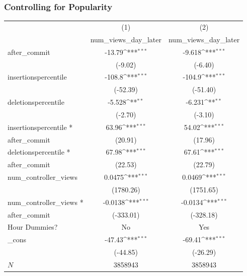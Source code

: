 \documentclass[xcolor=pdftex,dvipsnames,table]{beamer}
\begin{document}
\frame
{
    \frametitle{Controlling for Popularity}
    \begin{table}[h!]
        \centering
        \tiny
    {
        \def\sym#1{\ifmmode^{#1}\else\(^{#1}\)\fi}
        \begin{tabular}{l*{2}{c}}
        \hline\hline
            &\multicolumn{1}{c}{(1)}&\multicolumn{1}{c}{(2)}\\
            &\multicolumn{1}{c}{num\_views\_day\_later}&\multicolumn{1}{c}{num\_views\_day\_later}\\
            \hline
            after\_commit&      -13.79\sym{***}&      -9.618\sym{***}\\
            &     (-9.02)         &     (-6.40)         \\
            [0.65em]
            insertionspercentile&      -108.8\sym{***}&      -104.9\sym{***}\\
            &    (-52.39)         &    (-51.40)         \\
            [0.65em]
            deletionspercentile&      -5.528\sym{**} &      -6.231\sym{**} \\
            &     (-2.70)         &     (-3.10)         \\
            [0.65em]
            insertionspercentile *&       63.96\sym{***}&       54.02\sym{***}\\
            after\_commit &     (20.91)         &     (17.96)         \\
            [0.65em]
            deletionspercentile *&       67.98\sym{***}&       67.61\sym{***}\\
            after\_commit&     (22.53)         &     (22.79)         \\
            [0.65em]
            num\_controller\_views&      0.0475\sym{***}&      0.0469\sym{***}\\
            &   (1780.26)         &   (1751.65)         \\
            [0.65em]
            num\_controller\_views *&     -0.0138\sym{***}&     -0.0134\sym{***}\\
            after\_commit&   (-333.01)         &   (-328.18)         \\
            [0.65em]
            Hour Dummies?  &      No               &    Yes        \\
            [0.65em]
            \_cons      &      -47.43\sym{***}&      -69.41\sym{***}\\
            &    (-44.85)         &    (-26.29)         \\
            \hline
            \(N\)       &     3858943         &     3858943         \\
            \hline\hline
            \end{tabular}
    }
    \label{table:full-controller-micro}
    \end{table}
}
\end{document}
